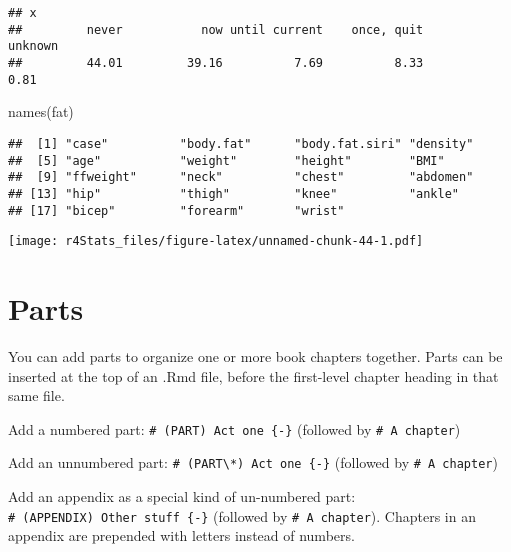 \documentclass[
]{book}
\newenvironment{Shaded}{\begin{snugshade}}{\end{snugshade}}
\newcommand{\FunctionTok}[1]{\textcolor[rgb]{0.00,0.00,0.00}{#1}}
\newcommand{\NormalTok}[1]{#1}
\newcommand{\SpecialCharTok}[1]{\textcolor[rgb]{0.00,0.00,0.00}{#1}}
\theoremstyle{definition}
\theoremstyle{definition}
\theoremstyle{definition}
\theoremstyle{definition}
\theoremstyle{remark}
\begin{document}
\begin{verbatim}
## x
##         never           now until current    once, quit       unknown 
##         44.01         39.16          7.69          8.33          0.81
\end{verbatim}

\begin{Shaded}
\begin{Highlighting}[]
\FunctionTok{names}\NormalTok{(fat)}
\end{Highlighting}
\end{Shaded}

\begin{verbatim}
##  [1] "case"          "body.fat"      "body.fat.siri" "density"      
##  [5] "age"           "weight"        "height"        "BMI"          
##  [9] "ffweight"      "neck"          "chest"         "abdomen"      
## [13] "hip"           "thigh"         "knee"          "ankle"        
## [17] "bicep"         "forearm"       "wrist"
\end{verbatim}

\begin{Shaded}
\end{Shaded}

\texttt{[image: r4Stats\_files/figure-latex/unnamed-chunk-44-1.pdf]}

\hypertarget{parts}{%
\chapter{Parts}\label{parts}}

You can add parts to organize one or more book chapters together. Parts can be inserted at the top of an .Rmd file, before the first-level chapter heading in that same file.

Add a numbered part: \texttt{\#\ (PART)\ Act\ one\ \{-\}} (followed by \texttt{\#\ A\ chapter})

Add an unnumbered part: \texttt{\#\ (PART\textbackslash{}*)\ Act\ one\ \{-\}} (followed by \texttt{\#\ A\ chapter})

Add an appendix as a special kind of un-numbered part: \texttt{\#\ (APPENDIX)\ Other\ stuff\ \{-\}} (followed by \texttt{\#\ A\ chapter}). Chapters in an appendix are prepended with letters instead of numbers.
\end{document}
